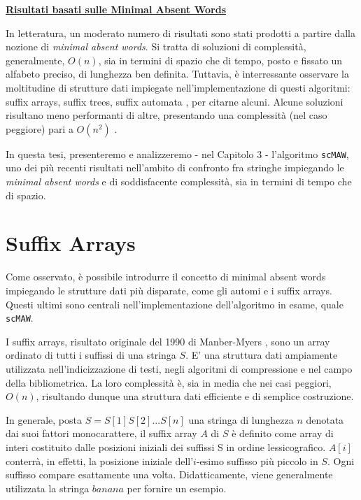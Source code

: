 \vspace{10mm}

\underline{\textbf{Risultati basati sulle Minimal Absent Words}}

\vspace{5mm}

In letteratura, un moderato numero di risultati sono stati prodotti a partire dalla nozione di \textit{minimal absent words}. Si tratta di soluzioni di complessità, generalmente, $O(n)$, sia in termini di spazio che di tempo, posto e fissato un alfabeto preciso, di lunghezza ben definita. Tuttavia, è interressante osservare la moltitudine di strutture dati impiegate nell'implementazione di questi algoritmi: suffix arrays, suffix trees, suffix automata \cite{CROCHEMORE1998111}, per citarne alcuni. Alcune soluzioni risultano meno performanti di altre, presentando una complessità (nel caso peggiore) pari a $O(n^2 )$ \cite{findingMaw}.

\vspace{3mm}

In questa tesi, presenteremo e analizzeremo - nel Capitolo 3 - l'algoritmo \verb|scMAW|, uno dei più recenti risultati nell'ambito di confronto fra stringhe impiegando le \textit{minimal absent words} e di soddisfacente complessità, sia in termini di tempo che di spazio.

\section{Suffix Arrays}

Come osservato, è possibile introdurre il concetto di minimal absent words impiegando le strutture dati più disparate, come gli automi e i suffix arrays. Questi ultimi sono centrali nell'implementazione dell'algoritmo in esame, quale \verb|scMAW|.

\vspace{3mm}

I suffix arrays, risultato originale del 1990 di Manber-Myers \cite{suffixArray}, sono un array ordinato di tutti i suffissi di una stringa $S$. E' una struttura dati ampiamente utilizzata nell'indicizzazione di testi, negli algoritmi di compressione e nel campo della bibliometrica. La loro complessità è, sia in media che nei casi peggiori, $O(n)$, risultando dunque una struttura dati efficiente e di semplice costruzione.

\vspace{3mm}

In generale, posta $S=S[1]S[2]...S[n]$ una stringa di lunghezza $n$ denotata dai suoi fattori monocarattere, il suffix array $A$ di $S$ è definito come array di interi costituito dalle posizioni iniziali dei suffissi S in ordine lessicografico. $A[i]$ conterrà, in effetti, la posizione iniziale dell'$i$-esimo suffisso più piccolo in $S$. Ogni suffisso compare esattamente una volta. Didatticamente, viene generalmente utilizzata la stringa $banana$ per fornire un esempio.

